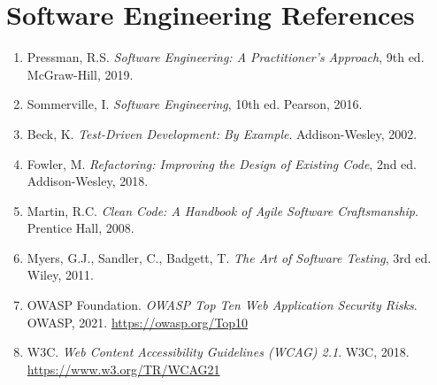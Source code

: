 \documentclass[12pt,a4paper]{report}
\begin{document}
\section{Software Engineering References}

\begin{enumerate}[leftmargin=1.5em]
  \item Pressman, R.S. \textit{Software Engineering: A Practitioner's Approach}, 9th ed. McGraw-Hill, 2019.
  \item Sommerville, I. \textit{Software Engineering}, 10th ed. Pearson, 2016.
  \item Beck, K. \textit{Test-Driven Development: By Example}. Addison-Wesley, 2002.
  \item Fowler, M. \textit{Refactoring: Improving the Design of Existing Code}, 2nd ed. Addison-Wesley, 2018.
  \item Martin, R.C. \textit{Clean Code: A Handbook of Agile Software Craftsmanship}. Prentice Hall, 2008.
  \item Myers, G.J., Sandler, C., Badgett, T. \textit{The Art of Software Testing}, 3rd ed. Wiley, 2011.
  \item OWASP Foundation. \textit{OWASP Top Ten Web Application Security Risks}. OWASP, 2021. \url{https://owasp.org/Top10}
  \item W3C. \textit{Web Content Accessibility Guidelines (WCAG) 2.1}. W3C, 2018. \url{https://www.w3.org/TR/WCAG21}
\end{enumerate}
\end{document}
